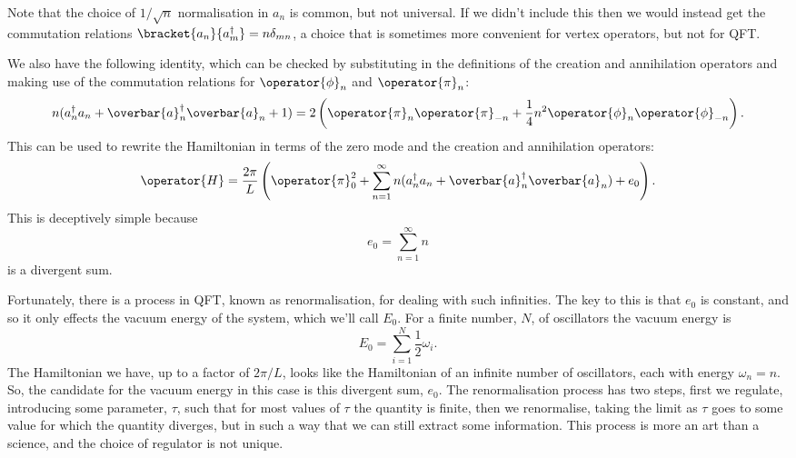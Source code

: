 \documentclass[fleqn]{NotesClass}
\newcommand{\hermit}{{\dagger}}
\begin{document}
    Note that the choice of \(1/\sqrt{n}\) normalisation in \(a_n\) is common, but not universal.
    If we didn't include this then we would instead get the commutation relations \(\bracket{a_n}{a_m^{\hermit}} = n\delta_{mn}\), a choice that is sometimes more convenient for vertex operators, but not for QFT.
    
    We also have the following identity, which can be checked by substituting in the definitions of the creation and annihilation operators and making use of the commutation relations for \(\operator{\phi}_n\) and \(\operator{\pi}_n\):
    \begin{equation}
        n(a_n^{\hermit} a_n + \overbar{a}_n^{\hermit}\overbar{a}_n + 1) = 2\left( \operator{\pi}_n \operator{\pi}_{-n} + \frac{1}{4}n^2 \operator{\phi}_n \operator{\phi}_{-n} \right).
    \end{equation}
    This can be used to rewrite the Hamiltonian in terms of the zero mode and the creation and annihilation operators:
    \begin{equation}
        \operator{H} = \frac{2\pi}{L}\left( \operator{\pi}_0^2 + \sum_{n=1}^{\infty} n(a_n^{\hermit}a_n + \overbar{a}_n^{\hermit} \overbar{a}_n) + e_0 \right).
    \end{equation}
    This is deceptively simple because
    \begin{equation}
        e_0 = \sum_{n=1}^{\infty} n
    \end{equation}
    is a divergent sum.
    
    Fortunately, there is a process in QFT, known as renormalisation, for dealing with such infinities.
    The key to this is that \(e_0\) is constant, and so it only effects the vacuum energy of the system, which we'll call \(E_0\).
    For a finite number, \(N\), of oscillators the vacuum energy is
    \begin{equation}
        E_0 = \sum_{i=1}^N \frac{1}{2}\omega_i.
    \end{equation}
    The Hamiltonian we have, up to a factor of \(2\pi/L\), looks like the Hamiltonian of an infinite number of oscillators, each with energy \(\omega_n = n\).
    So, the candidate for the vacuum energy in this case is this divergent sum, \(e_0\).
    The renormalisation process has two steps, first we regulate, introducing some parameter, \(\tau\), such that for most values of \(\tau\) the quantity is finite, then we renormalise, taking the limit as \(\tau\) goes to some value for which the quantity diverges, but in such a way that we can still extract some information.
    This process is more an art than a science, and the choice of regulator is not unique.
    
\end{document}
